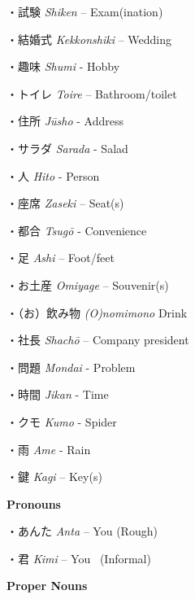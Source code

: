 \par{・試験 \emph{Shiken }– Exam(ination) }

\par{・結婚式 \emph{Kekkonshiki }– Wedding }

\par{・趣味 \emph{Shumi }- Hobby }

\par{・トイレ \emph{Toire }– Bathroom\slash toilet }

\par{・住所 \emph{Jūsho }- Address }

\par{・サラダ \emph{Sarada }- Salad }

\par{・人 \emph{Hito }- Person }

\par{・座席 \emph{Zaseki }– Seat(s) }

\par{・都合 \emph{Tsugō }- Convenience }

\par{・足 \emph{Ashi }– Foot\slash feet }

\par{・お土産 \emph{Omiyage }– Souvenir(s) }

\par{・（お）飲み物 \emph{(O)nomimono }Drink }

\par{・社長 \emph{Shachō }– Company president }

\par{・問題 \emph{Mondai }- Problem }

\par{・時間 \emph{Jikan }- Time }

\par{・クモ \emph{Kumo }- Spider }

\par{・雨 \emph{Ame }- Rain }

\par{・鍵 \emph{Kagi }– Key(s) }

\par{\textbf{Pronouns }}

\par{・あんた \emph{Anta }– You (Rough) }

\par{・君 \emph{Kimi }– You  (Informal) }

\par{\textbf{Proper Nouns }}

